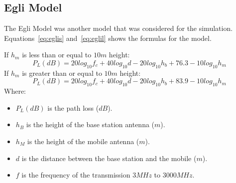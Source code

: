 \subsection{Egli Model}
The Egli Model was another model that was considered for the simulation. Equations~\ref{eq:eglis} and~\ref{eq:eglil} shows the formulas for the model.

If $h_{m}$ is less than or equal to $10 m$ height:
\begin{equation}\label{eq:eglis}
P_{L}(dB) = 20log_{10}f_{c}+40log_{10}d-20log_{10}h_{b}+76.3-10log_{10}h_{m}
\end{equation}
If $h_{m}$ is greater than or equal to $10 m$ height:
\begin{equation}\label{eq:eglil}
P_{L}(dB) = 20log_{10}f_{c}+40log_{10}d-20log_{10}h_{b}+83.9-10log_{10}h_{m}
\end{equation}
Where:
\begin{itemize}
\item $P_{L}(dB)$ is the path loss ($dB$).
\item $h_{B}$ is the height of the base station antenna ($m$).
\item $h_{M}$ is the height of the mobile antenna ($m$).
\item $d$ is the distance between the base station and the mobile ($m$).
\item $f$ is the frequency of the transmission $3 MHz$ to $3000 MHz$.
\end{itemize}
